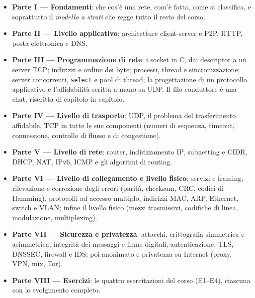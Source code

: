 \begin{itemize}
    \item \textbf{Parte I --- Fondamenti}: che cos'è una rete, com'è fatta, come si classifica, e
          soprattutto il \emph{modello a strati} che regge tutto il resto del corso.
    \item \textbf{Parte II --- Livello applicativo}: architetture client-server e P2P, HTTP,
          posta elettronica e DNS.
    \item \textbf{Parte III --- Programmazione di rete}: i socket in C, dai descriptor a un server TCP; indirizzi e ordine
          dei byte; processi, thread e sincronizzazione; server concorrenti, \texttt{select} e pool di thread; la
          progettazione di un protocollo applicativo e l'affidabilità scritta a mano su UDP. Il filo conduttore è una
          chat, riscritta di capitolo in capitolo.
    \item \textbf{Parte IV --- Livello di trasporto}: UDP, il problema del trasferimento affidabile,
          TCP in tutte le sue componenti (numeri di sequenza, timeout, connessione, controllo di
          flusso e di congestione).
    \item \textbf{Parte V --- Livello di rete}: router, indirizzamento IP, subnetting e CIDR,
          DHCP, NAT, IPv6, ICMP e gli algoritmi di routing.
    \item \textbf{Parte VI --- Livello di collegamento e livello fisico}: servizi e framing, rilevazione e
          correzione degli errori (parità, checksum, CRC, codici di Hamming), protocolli ad accesso multiplo,
          indirizzi MAC, ARP, Ethernet, switch e VLAN; infine il livello fisico (mezzi trasmissivi, codifiche di
          linea, modulazione, multiplexing).
    \item \textbf{Parte VII --- Sicurezza e privatezza}: attacchi, crittografia simmetrica e asimmetrica,
          integrità dei messaggi e firme digitali, autenticazione, TLS, DNSSEC, firewall e IDS; poi anonimato e
          privatezza su Internet (proxy, VPN, mix, Tor).
    \item \textbf{Parte VIII --- Esercizi}: le quattro esercitazioni del corso (E1--E4), ciascuna con
          lo svolgimento completo.
\end{itemize}


